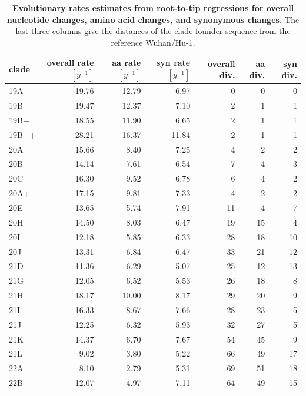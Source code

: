 \documentclass[aps,rmp, twocolumn]{revtex4}
\begin{document}
\begin{table}
\begin{tabular}{l|rrrrrr}
    \hline
    {\bf clade} &  overall rate $[y^{-1}]$ & aa rate $[y^{-1}]$ &  syn rate $[y^{-1}]$ & overall div. &  aa div. &  syn div. \\
    \hline
    19A &     19.76 &    12.79 &      6.97 &        0 &       0 &        0 \\
    19B &     19.47 &    12.37 &      7.10 &        2 &       1 &        1 \\
   19B+ &     18.55 &    11.90 &      6.65 &        2 &       1 &        1 \\
  19B++ &     28.21 &    16.37 &     11.84 &        2 &       1 &        1 \\
    20A &     15.66 &     8.40 &      7.25 &        4 &       2 &        2 \\
    20B &     14.14 &     7.61 &      6.54 &        7 &       4 &        3 \\
    20C &     16.30 &     9.52 &      6.78 &        6 &       4 &        2 \\
   20A+ &     17.15 &     9.81 &      7.33 &        4 &       2 &        2 \\
    20E &     13.65 &     5.74 &      7.91 &       11 &       4 &        7 \\
    20H &     14.50 &     8.03 &      6.47 &       19 &      15 &        4 \\
    20I &     12.18 &     5.85 &      6.33 &       28 &      18 &       10 \\
    20J &     13.31 &     6.84 &      6.47 &       33 &      21 &       12 \\
    21D &     11.36 &     6.29 &      5.07 &       25 &      12 &       13 \\
    21G &     12.05 &     6.52 &      5.53 &       26 &      18 &        8 \\
    21H &     18.17 &    10.00 &      8.17 &       29 &      20 &        9 \\
    21I &     16.33 &     8.67 &      7.66 &       28 &      23 &        5 \\
    21J &     12.25 &     6.32 &      5.93 &       32 &      27 &        5 \\
    21K &     14.37 &     6.70 &      7.67 &       54 &      45 &        9 \\
    21L &      9.02 &     3.80 &      5.22 &       66 &      49 &       17 \\
    22A &      8.10 &     2.79 &      5.31 &       69 &      51 &       18 \\
    22B &     12.07 &     4.97 &      7.11 &       64 &      49 &       15 \\
      \hline
    \end{tabular}
\caption{{\bf Evolutionary rates estimates from root-to-tip regressions for overall nucleotide changes, amino acid changes, and synonymous changes.}
    The last three columns give the distances of the clade founder sequence from the reference Wuhan/Hu-1.
\label{tab:rates}}
\end{table}
\end{document}
